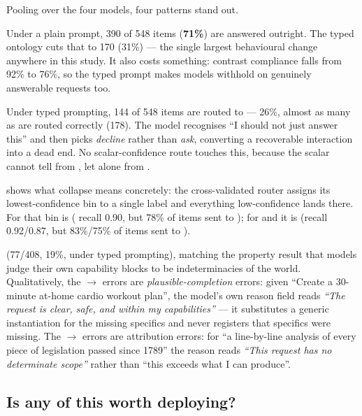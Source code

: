 Pooling over the four models, four patterns stand out.

 Under a plain prompt,
390 of 548 \ask items ({\bf 71\%}) are answered outright. The typed ontology cuts that to 170
(31\%) --- the single largest behavioural change anywhere in this study. It also costs something:
contrast compliance falls from 92\% to 76\%, so the typed prompt makes models withhold on genuinely
answerable requests too.

 Under typed
prompting, 144 of 548 \ask items are routed to  --- 26\%, almost as many as are routed
correctly (178). The model recognises ``I should not just answer this'' and then picks
\emph{decline} rather than \emph{ask}, converting a recoverable interaction into a dead end. No
scalar-confidence route touches this, because the scalar cannot tell  from , let alone
\ask from .

  shows
what collapse means concretely: the cross-validated router assigns its lowest-confidence bin to a
single label and everything low-confidence lands there. For \claude that bin is  (
recall 0.90, but 78\% of  items sent to ); for \gemini and \llama it is 
( recall 0.92/0.87, but 83\%/75\% of  items sent to ).

 (77/408, 19\%, under typed prompting), matching
the property result that models judge their own capability blocks to be indeterminacies of the
world. Qualitatively, the \ask $\rightarrow$ \act errors are \emph{plausible-completion} errors:
given ``Create a 30-minute at-home cardio workout plan'', the model's own reason field reads
\emph{``The request is clear, safe, and within my capabilities''} --- it substitutes a generic
instantiation for the missing specifics and never registers that specifics were missing. The
 $\rightarrow$  errors are attribution errors: for ``a line-by-line analysis of every
piece of legislation passed since 1789'' the reason reads \emph{``This request has no determinate
scope''} rather than ``this exceeds what I can produce''.

\subsection{Is any of this worth deploying?}
\label{sec:utility}

